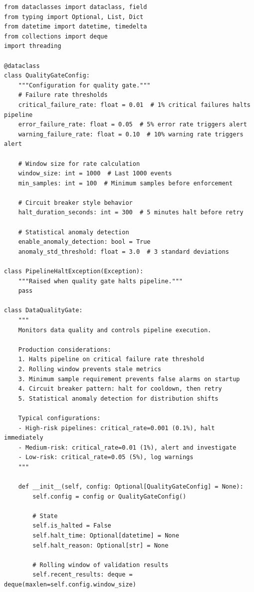 \begin{lstlisting}[style=python, caption={Data Quality Gate Implementation}]
from dataclasses import dataclass, field
from typing import Optional, List, Dict
from datetime import datetime, timedelta
from collections import deque
import threading

@dataclass
class QualityGateConfig:
    """Configuration for quality gate."""
    # Failure rate thresholds
    critical_failure_rate: float = 0.01  # 1% critical failures halts pipeline
    error_failure_rate: float = 0.05  # 5% error rate triggers alert
    warning_failure_rate: float = 0.10  # 10% warning rate triggers alert

    # Window size for rate calculation
    window_size: int = 1000  # Last 1000 events
    min_samples: int = 100  # Minimum samples before enforcement

    # Circuit breaker style behavior
    halt_duration_seconds: int = 300  # 5 minutes halt before retry

    # Statistical anomaly detection
    enable_anomaly_detection: bool = True
    anomaly_std_threshold: float = 3.0  # 3 standard deviations

class PipelineHaltException(Exception):
    """Raised when quality gate halts pipeline."""
    pass

class DataQualityGate:
    """
    Monitors data quality and controls pipeline execution.

    Production considerations:
    1. Halts pipeline on critical failure rate threshold
    2. Rolling window prevents stale metrics
    3. Minimum sample requirement prevents false alarms on startup
    4. Circuit breaker pattern: halt for cooldown, then retry
    5. Statistical anomaly detection for distribution shifts

    Typical configurations:
    - High-risk pipelines: critical_rate=0.001 (0.1%), halt immediately
    - Medium-risk: critical_rate=0.01 (1%), alert and investigate
    - Low-risk: critical_rate=0.05 (5%), log warnings
    """

    def __init__(self, config: Optional[QualityGateConfig] = None):
        self.config = config or QualityGateConfig()

        # State
        self.is_halted = False
        self.halt_time: Optional[datetime] = None
        self.halt_reason: Optional[str] = None

        # Rolling window of validation results
        self.recent_results: deque = deque(maxlen=self.config.window_size)


\end{lstlisting}
